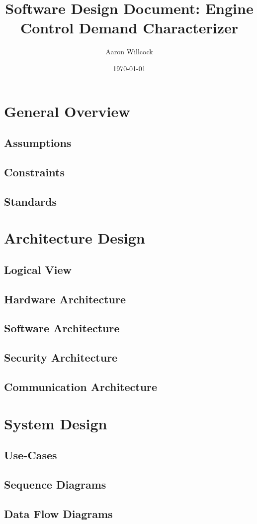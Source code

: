 \documentclass[12pt,a4paper]{article}
\title{Software Design Document: Engine Control Demand Characterizer}
\date{\today}
\author{Aaron Willcock}
\begin{document}
\maketitle



\section{General Overview}
\subsection{Assumptions}
\subsection{Constraints}
\subsection{Standards}
\section{Architecture Design}
\subsection{Logical View}
\subsection{Hardware Architecture}
\subsection{Software Architecture}
\subsection{Security Architecture}
\subsection{Communication Architecture}
\section{System Design}
\subsection{Use-Cases}
\subsection{Sequence Diagrams}
\subsection{Data Flow Diagrams}


\end{document}

